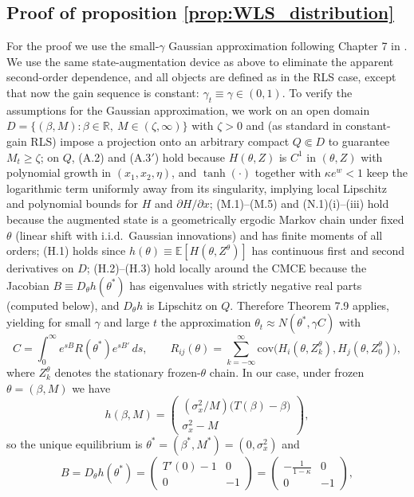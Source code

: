 \subsection{Proof of proposition \ref{prop:WLS_distribution}}\label{app:proofs_WLS}
For the proof we use the small-$\gamma$ Gaussian approximation following Chapter 7 in \cite{GeorgeWEvans2001}.
We use the same state-augmentation device as above to eliminate the apparent second-order dependence, and all objects are defined as in the RLS case, except that now the gain sequence is constant: $\gamma_t\equiv \gamma\in(0,1)$.
To verify the assumptions for the Gaussian approximation, we work on an open domain $D=\{(\beta,M):\beta\in\mathbb R,\ M\in(\zeta,\infty)\}$ with $\zeta>0$ and (as standard in constant-gain RLS) impose a projection onto an arbitrary compact $Q\Subset D$ to guarantee $M_t\ge\zeta$; on $Q$, (A.2) and (A.3$'$) hold because $H(\theta,Z)$ is $C^1$ in $(\theta,Z)$ with polynomial growth in $(x_1,x_2,\eta)$, and $\tanh(\cdot)$ together with $\kappa e^{w}<1$ keep the logarithmic term uniformly away from its singularity, implying local Lipschitz and polynomial bounds for $H$ and $\partial H/\partial x$; (M.1)–(M.5) and (N.1)(i)–(iii) hold because the augmented state is a geometrically ergodic Markov chain under fixed $\theta$ (linear shift with i.i.d.\ Gaussian innovations) and has finite moments of all orders; (H.1) holds since $h(\theta)\equiv \mathbb E[H(\theta,Z^\theta)]$ has continuous first and second derivatives on $D$; (H.2)–(H.3) hold locally around the CMCE because the Jacobian $B\equiv D_\theta h(\theta^*)$ has eigenvalues with strictly negative real parts (computed below), and $D_\theta h$ is Lipschitz on $Q$. Therefore Theorem 7.9 applies, yielding for small $\gamma$ and large $t$ the approximation $\theta_t\approx N(\theta^*,\gamma C)$ with
\[
C=\int_0^\infty e^{sB}R(\theta^*)e^{sB'}\,ds,
\qquad
R_{ij}(\theta)=\sum_{k=-\infty}^{\infty}\mathrm{cov}\!\big(H_i(\theta,Z^\theta_k),H_j(\theta,Z^\theta_0)\big),
\]
where $Z_k^\theta$ denotes the stationary frozen-$\theta$ chain. 
In our case, under frozen $\theta=(\beta,M)$ we have
\[
h(\beta,M)=
\begin{pmatrix}
(\sigma_x^2/M)\big(T(\beta)-\beta\big)\\
\sigma_x^2-M
\end{pmatrix},
\]
so the unique equilibrium is $\theta^*=(\beta^*,M^*)=(0,\sigma_x^2)$ and
\[
B=D_\theta h(\theta^*)=
\begin{pmatrix}
T'(0)-1 & 0\\
0 & -1
\end{pmatrix}
=
\begin{pmatrix}
-\frac{1}{1-\kappa} & 0\\
0 & -1
\end{pmatrix},
\]

